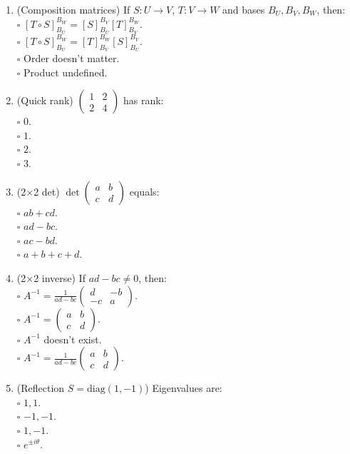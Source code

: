 \documentclass[11pt]{article}
\begin{document}
\begin{enumerate}
\item (Composition matrices) If $S:U\to V$, $T:V\to W$ and bases $B_U,B_V,B_W$, then:\\
\(\square\) $[T\circ S]_{B_U}^{B_W}=[S]_{B_U}^{B_V}[T]_{B_V}^{B_W}$.\\
\(\square\) $[T\circ S]_{B_U}^{B_W}=[T]_{B_V}^{B_W}[S]_{B_U}^{B_V}$.\\
\(\square\) Order doesn’t matter.\\
\(\square\) Product undefined.

\item (Quick rank) $\begin{pmatrix}1&2\\2&4\end{pmatrix}$ has rank:\\
\(\square\) $0$.\\
\(\square\) $1$.\\
\(\square\) $2$.\\
\(\square\) $3$.

\item (2×2 det) $\det\begin{pmatrix}a&b\\c&d\end{pmatrix}$ equals:\\
\(\square\) $ab+cd$.\\
\(\square\) $ad-bc$.\\
\(\square\) $ac-bd$.\\
\(\square\) $a+b+c+d$.

\item (2×2 inverse) If $ad-bc\neq 0$, then:\\
\(\square\) $A^{-1}=\frac{1}{ad-bc}\begin{pmatrix}d&-b\\-c&a\end{pmatrix}$.\\
\(\square\) $A^{-1}=\begin{pmatrix}a&b\\c&d\end{pmatrix}$.\\
\(\square\) $A^{-1}$ doesn’t exist.\\
\(\square\) $A^{-1}=\frac{1}{ad-bc}\begin{pmatrix}a&b\\c&d\end{pmatrix}$.

\item (Reflection $S=\mathrm{diag}(1,-1)$) Eigenvalues are:\\
\(\square\) $1,1$.\\
\(\square\) $-1,-1$.\\
\(\square\) $1,-1$.\\
\(\square\) $e^{\pm i\theta}$.


\end{enumerate}
\end{document}
